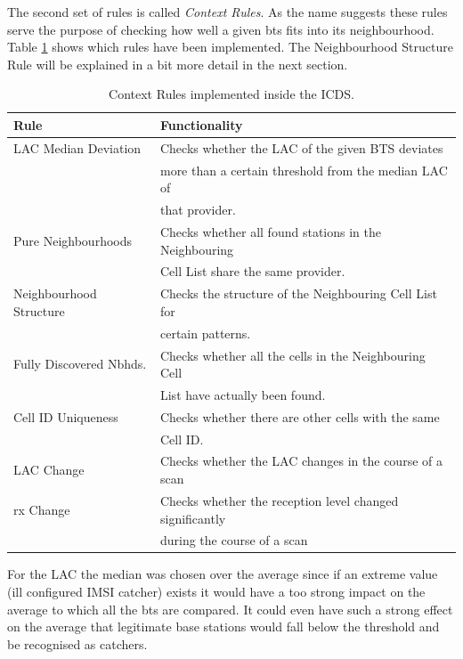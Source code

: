 The second set of rules is called \emph{Context Rules}.
As the name suggests these rules serve the purpose of checking how well a given \gls{bts} fits into its neighbourhood.
Table \ref{tab:context_rules} shows which rules have been implemented.
The Neighbourhood Structure Rule will be explained in a bit more detail in the next section.
\begin{table}
\centering
\begin{tabular}{ll}
\toprule
Rule					&Functionality\\
\midrule
LAC Median Deviation	&Checks whether the LAC of the given BTS deviates\\
						&more than a certain threshold from the median LAC of\\
						&that provider.\\
Pure Neighbourhoods		&Checks whether all found stations in the Neighbouring\\
						&Cell List share the same provider.\\
Neighbourhood Structure	&Checks the structure of the Neighbouring Cell List for\\
						&certain patterns.\\
Fully Discovered Nbhds. &Checks whether all the cells in the Neighbouring Cell\\
						&List have actually been found.\\
Cell ID Uniqueness 		&Checks whether there are other cells with the same\\
						&Cell ID.\\
LAC Change 				&Checks whether the LAC changes in the course of a scan\\
rx Change				&Checks whether the reception level changed significantly\\
						&during the course of a scan\\
\bottomrule
\end{tabular}
\caption{Context Rules implemented inside the ICDS.}
\label{tab:context_rules}
\end{table}
For the LAC the median was chosen over the average since if an extreme value (ill configured IMSI catcher) exists it would have a too strong impact on the average to which all the \gls{bts} are compared.
It could even have such a strong effect on the average that legitimate base stations would fall below the threshold and be recognised as catchers.

